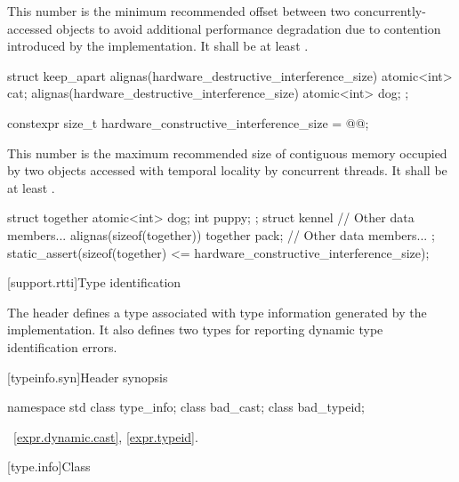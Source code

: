 \pnum
This number is the minimum recommended offset
between two concurrently-accessed objects
to avoid additional performance degradation due to contention
introduced by the implementation.
It shall be at least .

%
\enterexample
\begin{codeblock}
struct keep_apart {
  alignas(hardware_destructive_interference_size) atomic<int> cat;
  alignas(hardware_destructive_interference_size) atomic<int> dog;
};
\end{codeblock}
\exitexample

%
\begin{codeblock}
constexpr size_t hardware_constructive_interference_size = @\impdef{}@;
\end{codeblock}

\pnum
This number is the maximum recommended size of contiguous memory
occupied by two objects accessed with temporal locality by concurrent threads.
It shall be at least .

%
\enterexample
\begin{codeblock}
struct together {
  atomic<int> dog;
  int puppy;
};
struct kennel {
  // Other data members...
  alignas(sizeof(together)) together pack;
  // Other data members...
};
static_assert(sizeof(together) <= hardware_constructive_interference_size);
\end{codeblock}
\exitexample

[support.rtti]{Type identification}

\pnum
The header
defines a
type associated with type information generated by the implementation.
It also defines two types for reporting dynamic type identification errors.

[typeinfo.syn]{Header  synopsis}
%
%
%
%
%

\begin{codeblock}
namespace std {
  class type_info;
  class bad_cast;
  class bad_typeid;
}
\end{codeblock}

\xref~\ref{expr.dynamic.cast}, \ref{expr.typeid}.

[type.info]{Class }

